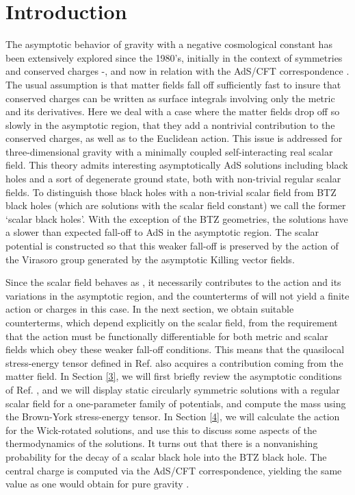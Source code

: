 \documentclass[a4paper,12pt]{article}
\begin{document}
\section{Introduction}

The asymptotic behavior of gravity with a negative cosmological constant has
been extensively explored since the 1980's, initially in the context
of symmetries and conserved charges \cite{Abbott:1981ff}-\cite
{Barnich:2003xg}, and now in relation with the AdS/CFT correspondence 
\cite{Maldacena:1997re,Gubser:1998bc,Witten:1998qj}. The usual assumption is
that matter fields fall off sufficiently fast to insure that conserved
charges can be written as surface integrals involving only the metric and
its derivatives. Here we deal with a case where the matter fields
drop off so slowly in the asymptotic region, that they add a nontrivial
contribution to the conserved charges, as well as to the Euclidean action.
This issue is addressed for three-dimensional gravity with a minimally
coupled self-interacting real scalar field. This theory admits interesting
asymptotically AdS solutions including black holes \cite{HMTZ} and a sort of
degenerate ground state, both with non-trivial regular scalar fields.  
To distinguish those black holes with a non-trivial scalar field from BTZ 
black holes (which  are solutions with the scalar field constant) we 
call the former `scalar black holes'.  With 
the exception of 
the BTZ geometries, the solutions have a slower than expected fall-off
to AdS in the asymptotic region. The scalar potential
is constructed so that this weaker fall-off is preserved by the action
of the Virasoro group generated by the asymptotic Killing vector fields.

Since the scalar field behaves as \coordHE{},  it necessarily contributes to the
action and its variations in the asymptotic region, and the counterterms
of  \cite{Henningson:1998gx}  will not yield a finite action or charges \cite
{Balasubramanian-Kraus} in this
case. In the next section, we obtain suitable counterterms, which depend
explicitly on the scalar field, from the requirement
that the action must be functionally differentiable for both metric
and scalar fields which obey these weaker fall-off conditions. This means that the
quasilocal stress-energy tensor defined in Ref. \cite{Brown-York} also
acquires a contribution coming from the matter field. In Section \ref{3}, we
will first briefly review the asymptotic conditions of Ref. \cite{HMTZ}, and
we will display static circularly symmetric solutions with a regular
scalar field for a one-parameter family of potentials, and compute the mass 
using the Brown-York stress-energy tensor. In Section \ref{4}, we will
calculate the action for the Wick-rotated solutions, and use this to discuss
some aspects of the thermodynamics of the solutions. It turns out that there
is a nonvanishing probability for the decay of a scalar black hole into the
BTZ black hole. The central charge is computed via the AdS/CFT
correspondence, yielding the same value as one would obtain for pure gravity \cite
{Brown-Henneaux}.
\end{document}
